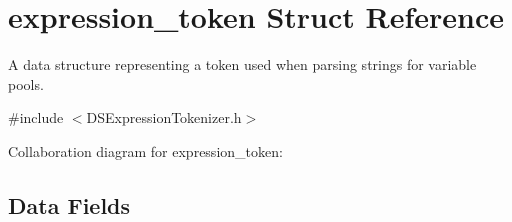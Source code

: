 \hypertarget{structexpression__token}{
\section{expression\_\-token Struct Reference}
\label{structexpression__token}
}


A data structure representing a token used when parsing strings for variable pools.  




{\ttfamily \#include $<$DSExpressionTokenizer.h$>$}



Collaboration diagram for expression\_\-token:\subsection*{Data Fields}

